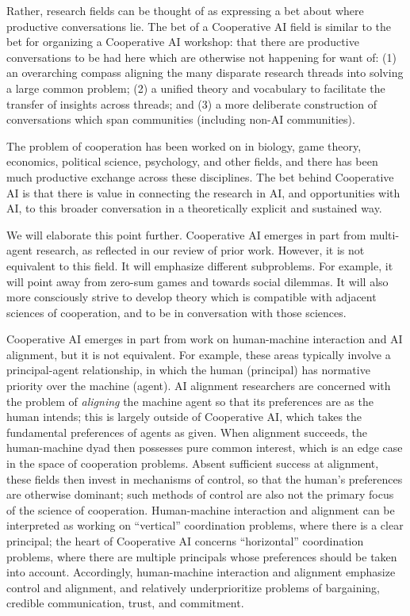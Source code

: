 \documentclass[11pt, a4paper, logo, onecolumn, nonumbering]{deepmind}
\begin{document}
Rather, research fields can be thought of as expressing a bet about where productive conversations lie. The bet of a Cooperative AI field is similar to the bet for organizing a Cooperative AI workshop: that there are productive conversations to be had here which are otherwise not happening for want of: (1) an overarching compass aligning the many disparate research threads into solving a large common problem; (2) a unified theory and vocabulary to facilitate the transfer of insights across threads; and (3) a more deliberate construction of conversations which span communities (including non-AI communities).

The problem of cooperation has been worked on in biology, game theory, economics, political science, psychology, and other fields, and there has been much productive exchange across these disciplines. The bet behind Cooperative AI is that there is value in connecting the research in AI, and opportunities with AI, to this broader conversation in a theoretically explicit and sustained way.

We will elaborate this point further. Cooperative AI emerges in part from multi-agent research, as reflected in our review of prior work. However, it is not equivalent to this field. It will emphasize different subproblems. For example, it will point away from zero-sum games and towards social dilemmas. It will also more consciously strive to develop theory which is compatible with adjacent sciences of cooperation, and to be in conversation with those sciences.

Cooperative AI emerges in part from work on human-machine interaction and AI alignment, but it is not equivalent. For example, these areas typically involve a principal-agent relationship, in which the human (principal) has normative priority over the machine (agent). AI alignment researchers are concerned with the problem of \textit{aligning} the machine agent so that its preferences are as the human intends; this is largely outside of Cooperative AI, which takes the fundamental preferences of agents as given. When alignment succeeds, the human-machine dyad then possesses pure common interest, which is an edge case in the space of cooperation problems. Absent sufficient success at alignment, these fields then invest in mechanisms of control, so that the human's preferences are otherwise dominant; such methods of control are also not the primary focus of the science of cooperation. Human-machine interaction and alignment can be interpreted as working on ``vertical'' coordination problems, where there is a clear principal; the heart of Cooperative AI concerns ``horizontal'' coordination problems, where there are multiple principals whose preferences should be taken into account. Accordingly, human-machine interaction and alignment emphasize control and alignment, and relatively underprioritize problems of bargaining, credible communication, trust, and commitment.
\end{document}
